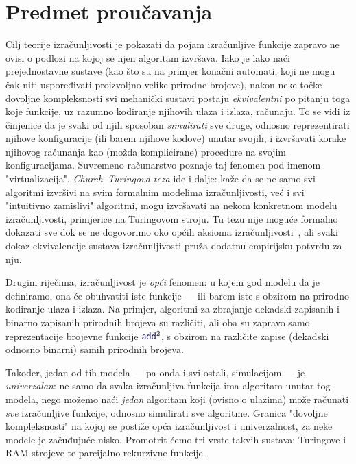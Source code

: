 \section{Predmet proučavanja}

Cilj teorije izračunljivosti je pokazati da pojam izračunljive funkcije zapravo ne ovisi o podlozi na kojoj se njen algoritam izvršava. Iako je lako naći prejednostavne sustave (kao što su na primjer konačni automati, koji ne mogu čak niti uspoređivati proizvoljno velike prirodne brojeve), nakon neke točke dovoljne kompleksnosti svi mehanički sustavi postaju \emph{ekvivalentni} po pitanju toga koje funkcije, uz razumno kodiranje njihovih ulaza i izlaza, računaju. To se vidi iz činjenice da je svaki od njih sposoban \emph{simulirati} sve druge, odnosno reprezentirati njihove konfiguracije (ili barem njihove kodove) unutar svojih, i izvršavati korake njihovog računanja kao (možda komplicirane) procedure na svojim konfiguracijama. Suvremeno računarstvo poznaje taj fenomen pod imenom "virtualizacija". \emph{Church--\!Turingova teza} ide i dalje: kaže da se ne samo svi algoritmi izvršivi na svim formalnim modelima izračunljivosti, već i svi "intuitivno zamislivi" algoritmi, mogu izvršavati na nekom konkretnom modelu izračunljivosti, primjerice na Turingovom stroju. Tu tezu nije moguće formalno dokazati sve dok se ne dogovorimo oko općih aksioma izračunljivosti~\cite{dershowitz}, ali svaki dokaz ekvivalencije sustava izračunljivosti pruža dodatnu empirijsku potvrdu za nju.

Drugim riječima, izračunljivost je \emph{opći} fenomen: u kojem god modelu da je definiramo, ona će obuhvatiti iste funkcije --- ili barem iste s obzirom na prirodno kodiranje ulaza i izlaza. Na primjer, algoritmi za zbrajanje dekadski zapisanih i binarno zapisanih prirodnih brojeva su različiti, ali oba su zapravo samo reprezentacije brojevne funkcije $\f{add}^2$, s obzirom na različite zapise (dekadski odnosno binarni) samih prirodnih brojeva.

Također, jedan od tih modela --- pa onda i svi ostali, simulacijom --- je \emph{univerzalan}: ne samo da svaka izračunljiva funkcija ima algoritam unutar tog modela, nego možemo naći \emph{jedan} algoritam koji (ovisno o ulazima) može računati \emph{sve} izračunljive funkcije, odnosno simulirati sve algoritme. Granica "dovoljne kompleksnosti" na kojoj se postiže opća izračunljivost i univerzalnost, za neke modele je začuđujuće nisko. Promotrit ćemo tri vrste takvih sustava: Turingove i RAM-strojeve te parcijalno rekurzivne funkcije.

